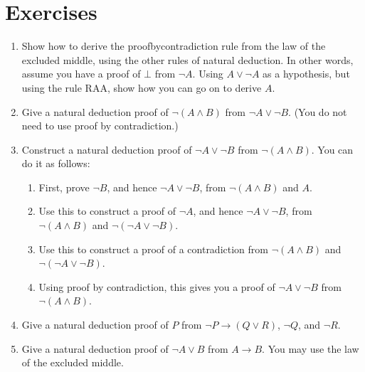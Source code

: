 \documentclass[letterpaper,10pt,english]{sphinxmanual}
\begin{document}
\section{Exercises}
\label{\detokenize{classical_reasoning:exercises}}\begin{enumerate}
%
\item {} 
\sphinxAtStartPar
Show how to derive the proof\sphinxhyphen{}by\sphinxhyphen{}contradiction rule from the law of the excluded middle, using the other rules of natural deduction. In other words, assume you have a proof of \(\bot\) from \(\neg A\). Using \(A \vee \neg A\) as a hypothesis, but  using the rule RAA, show how you can go on to derive \(A\).

\item {} 
\sphinxAtStartPar
Give a natural deduction proof of \(\neg (A \wedge B)\) from \(\neg A \vee \neg B\). (You do not need to use proof by contradiction.)

\item {} 
\sphinxAtStartPar
Construct a natural deduction proof of \(\neg A \vee \neg B\) from \(\neg (A \wedge B)\). You can do it as follows:
\begin{enumerate}
%
\item {} 
\sphinxAtStartPar
First, prove \(\neg B\), and hence \(\neg A \vee \neg B\), from \(\neg (A \wedge B)\) and \(A\).

\item {} 
\sphinxAtStartPar
Use this to construct a proof of \(\neg A\), and hence \(\neg A \vee \neg B\), from \(\neg (A \wedge B)\) and \(\neg (\neg A \vee \neg B)\).

\item {} 
\sphinxAtStartPar
Use this to construct a proof of a contradiction from \(\neg (A \wedge B)\) and \(\neg (\neg A \vee \neg B)\).

\item {} 
\sphinxAtStartPar
Using proof by contradiction, this gives you a proof of \(\neg A \vee \neg B\) from \(\neg (A \wedge B)\).

\end{enumerate}

\item {} 
\sphinxAtStartPar
Give a natural deduction proof of \(P\) from \(\neg P \to (Q \vee R)\), \(\neg Q\), and \(\neg R\).

\item {} 
\sphinxAtStartPar
Give a natural deduction proof of \(\neg A \vee B\) from \(A \to B\). You may use the law of the excluded middle.


\end{enumerate}
\end{document}
